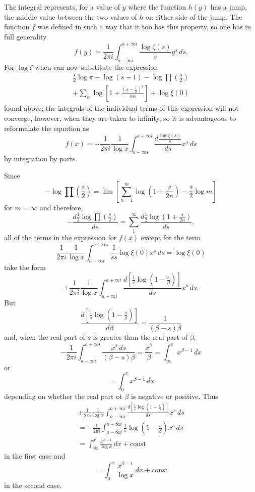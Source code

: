 The integral represents, for a value of $y$ where the function $h(y)$ has a
jump, the middle value between the two values of $h$ on either side of the
jump. The function $f$ was defined in such a way that it too has this property,
so one has in full generality
%
\[
f(y) 
= \frac{1}{2\pi i}\int_{a-\infty i}^{a+\infty i} \frac{\log\zeta(s)}{s}y^s \, ds.
\]
%
For $\log\zeta$ when can now substitute the expression
%
\begin{align*}
    \frac{s}{2}\log\pi - \log(s-1) - \log\prod\left(\frac{s}{2}\right) \\
    + \sum_{\alpha} \log\left[1 + \frac{(s - \frac{1}{2})^2}{\alpha\alpha}\right]
    + \log\xi(0)
\end{align*}
%
found above; the integrals of the individual terms of this expression will not
converge, however, when they are taken to infinity, so it is advantageous to
reformulate the equation as
%
\[
f(x) = -\frac{1}{2\pi i}\frac{1}{\log x}
\int_{a-\infty i}^{a+\infty i} \frac{d\frac{\log\zeta(s)}{s}}{ds} x^s \, ds
\]
%
by integration by parts.

Since
%
\[
-\log\prod\left(\frac{s}{2}\right) 
= \lim\left[ \sum_{n=1}^{m} \log\left( 1 + \frac{s}{2n} \right) 
- \frac{s}{2}\log m \right]
\]
%
for $m=\infty$ and therefore,
%
\[
-\frac{d\frac{1}{2}\log\prod\left(\frac{s}{2}\right)}{ds}
= \sum_{1}^{\infty} \frac{d\frac{1}{2}\log\left(1 + \frac{s}{2n}\right)}{ds},
\]
%
all of the terms in the expression for $f(x)$ except for the term
%
\[
\frac{1}{2\pi i}\frac{1}{\log x} 
\int_{a-\infty i}^{a+\infty i} \frac{1}{ss}\log\xi(0)x^s \, ds = \log\xi(0)
\]
%
take the form
%
\[
\pm\frac{1}{2\pi i}\frac{1}{\log x}
\int_{a-\infty i}^{a+\infty i} 
\frac{d\left[\frac{1}{s}\log\left(1 - \frac{s}{\beta}\right)\right]}{ds}x^s \, ds.
\]
%
But
%
\[
\frac{d\left[\frac{1}{s}\log\left(1 - \frac{s}{\beta}\right)\right]}{d\beta} 
= \frac{1}{(\beta - s)\beta}
\]
%
and, when the real part of $s$ is greater than the real part of $\beta$,
%
\[
-\frac{1}{2\pi i}\int_{a-\infty i}^{a+\infty i}
\frac{x^s \, ds}{(\beta - s)\beta} 
= \frac{x^{\beta}}{\beta}
= \int_{\infty}^x x^{\beta - 1} \, dx
\]
%
or
%
\[
= \int_0^x x^{\beta - 1} \, dx
\]
%
depending on whether the real part ot $\beta$ is negative or positive.
Thus
%
\begin{align*}
    \pm\frac{1}{2\pi i}\frac{1}{\log x}
    \int_{a-\infty i}^{a+\infty i}
    \frac{d\left[\frac{1}{s}\log\left(1 - \frac{s}{\beta}\right)\right]}
    {ds}x^s \, ds \\
    = -\frac{1}{2\pi i}\int_{a-\infty i}^{a+\infty i}
    \frac{1}{s}\log\left( 1 - \frac{s}{\beta} \right)x^s \, ds \\
    = \int_{\infty}^x \frac{x^{\beta - 1}}{\log x} \, dx + \text{const}
\end{align*}
%
in the first case and
%
\[
= \int_0^x \frac{x^{\beta - 1}}{\log x} \, dx + \text{const}
\]
%
in the second case.

